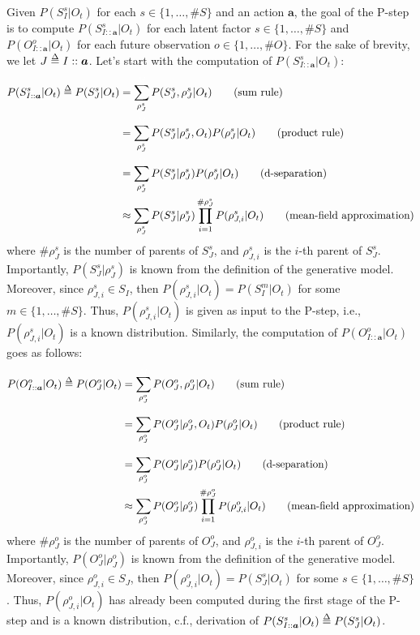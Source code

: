 \documentclass[twoside,11pt]{article}
\def\delequal{\mathrel{\ensurestackMath{\stackon[1pt]{=}{\scriptstyle\Delta}}}}
\newcommand{\nb}[1]{\# #1}
\begin{document}
Given $P(S_{I}^s|O_t)$ for each $s \in \{1, \hdots, \nb{S}\}$ and an action $\bm{a}$, the goal of the P-step is to compute $P(S_{I::\bm{a}}^s|O_t)$ for each latent factor $s \in \{1, \hdots, \nb{S}\}$ and $P(O_{I::\bm{a}}^o|O_t)$ for each future observation $o \in \{1, \hdots, \nb{O}\}$. For the sake of brevity, we let $J \delequal I::\bm{a}$. Let's start with the computation of $P(S_{I::\bm{a}}^s|O_t)$:
\begin{align*}
P(S_{I::\bm{a}}^s|O_t) \delequal P(S_J^s|O_t) &= \sum_{\rho_J^s}^{{\color{white}M}} P(S_J^s, \rho_J^s |O_t) \tag{sum rule}\\
&= \sum_{\rho_J^s}^{{\color{white}M}} P(S_J^s| \rho_J^s, O_t)P(\rho_J^s| O_t) \tag{product rule}\\
&= \sum_{\rho_J^s}^{{\color{white}M}} P(S_J^s| \rho_J^s)P(\rho_J^s| O_t) \tag{d-separation}\\
&\approx \sum_{\rho_J^s} P(S_J^s| \rho_J^s) \prod_{i=1}^{\nb{\rho_J^s}} P(\rho_{J,i}^s| O_t) \tag{mean-field approximation}
\end{align*}
where $\nb{\rho_J^s}$ is the number of parents of $S^s_J$, and $\rho_{J,i}^s$ is the $i$-th parent of $S^s_J$. Importantly, $P(S_J^s| \rho_J^s)$ is known from the definition of the generative model. Moreover, since $\rho_{J,i}^s \in S_I$, then $P(\rho_{J,i}^s| O_t) = P(S_{I}^m|O_t)$ for some $m \in \{1, \hdots, \nb{S}\}$. Thus, $P(\rho_{J,i}^s| O_t)$ is given as input to the P-step, i.e., $P(\rho_{J,i}^s| O_t)$ is a known distribution. Similarly, the computation of  $P(O_{I::\bm{a}}^o|O_t)$ goes as follows:
\begin{align*}
P(O_{I::\bm{a}}^o|O_t) \delequal P(O_J^o|O_t) &= \sum_{\rho_J^o}^{{\color{white}M}} P(O_J^o, \rho_J^o |O_t) \tag{sum rule}\\
&= \sum_{\rho_J^o}^{{\color{white}M}} P(O_J^o| \rho_J^o, O_t)P(\rho_J^o| O_t) \tag{product rule}\\
&= \sum_{\rho_J^o}^{{\color{white}M}} P(O_J^o| \rho_J^o)P(\rho_J^o| O_t) \tag{d-separation}\\
&\approx \sum_{\rho_J^o} P(O_J^o| \rho_J^o) \prod_{i=1}^{\nb{\rho_J^o}} P(\rho_{J,i}^o| O_t) \tag{mean-field approximation}
\end{align*}
where $\nb{\rho_J^o}$ is the number of parents of $O^o_J$, and $\rho_{J,i}^o$ is the $i$-th parent of $O^o_J$. Importantly, $P(O_J^o| \rho_J^o)$ is known from the definition of the generative model. Moreover, since $\rho_{J,i}^o \in S_J$, then $P(\rho_{J,i}^o| O_t) = P(S_{J}^s|O_t)$ for some $s \in \{1, \hdots, \nb{S}\}$. Thus, $P(\rho_{J,i}^o| O_t)$ has already been computed during the first stage of the P-step and is a known distribution, c.f., derivation of $P(S_{I::\bm{a}}^s|O_t) \delequal P(S_J^s|O_t)$.
\end{document}
